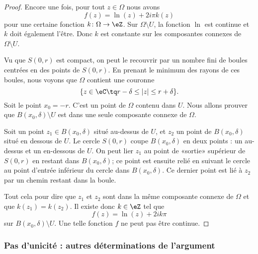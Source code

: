 \begin{proof}
    Encore une fois, pour tout \( z\in \Omega\) nous avons
    \begin{equation}
        f(z)=\ln(z)+2i\pi k(z)
    \end{equation}
    pour une certaine fonction \( k\colon \Omega\to \eZ\). Sur \( \Omega\setminus U\), la fonction \( \ln\) est continue et \( k\) doit également l'être. Donc \( k\) est constante sur les composantes connexes de \( \Omega\setminus U\).

    Vu que \( S(0,r)\) est compact, on peut le recouvrir par un nombre fini de boules centrées en des points de \( S(0,r)\). En prenant le minimum des rayons de ces boules, nous voyons que \( \Omega\) contient une couronne 
    \begin{equation}
        \{ z\in \eC\tq r-\delta\leq | z |\leq r+\delta \}.
    \end{equation}
    Soit le point \( x_0=-r\). C'est un point de \( \Omega\) contenu dans \( U\). Nous allons prouver que \( B(x_0,\delta)\setminus U\) est dans une seule composante connexe de \( \Omega\). 

    Soit un point \( z_1\in B(x_0,\delta)\) situé au-dessus de \( U\), et \( z_2\) un point de \( B(x_0,\delta)\) situé en dessous de \( U\). Le cercle \( S(0,r)\) coupe \( B(x_0,\delta)\) en deux points : un au-dessus et un en-dessous de \( U\). On peut lier \( z_1\) au point de «sortie» supérieur de \( S(0,r)\) en restant dans \( B(x_0,\delta)\); ce point est ensuite relié en suivant le cercle au point d'entrée inférieur du cercle dans \( B(x_0,\delta)\). Ce dernier point est lié à \( z_2\) par un chemin restant dans la boule.

    Tout cela pour dire que \( z_1\) et \( z_2\) sont dans la même composante connexe de \( \Omega\) et que \( k(z_1)=k(z_2)\). Il existe donc \( k\in \eZ\) tel que
    \begin{equation}
        f(z)=\ln(z)+2ik\pi
    \end{equation}
    sur \( B(x_0,\delta)\setminus U\). Une telle fonction \( f\) ne peut pas être continue.
\end{proof}

\subsubsection{Pas d'unicité : autres déterminations de l'argument}


